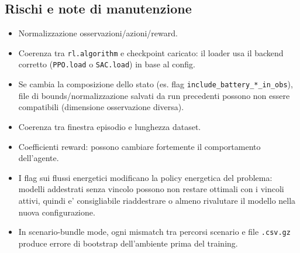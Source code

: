 \subsection*{Rischi e note di manutenzione}
\begin{itemize}[leftmargin=1.2cm]
\item Normalizzazione osservazioni/azioni/reward.
\item Coerenza tra \texttt{rl.algorithm} e checkpoint caricato:
  il loader usa il backend corretto (\texttt{PPO.load} o \texttt{SAC.load}) in base al config.
\item Se cambia la composizione dello stato (es. flag \texttt{include\_battery\_*\_in\_obs}),
  file di bounds/normalizzazione salvati da run precedenti possono non essere compatibili
  (dimensione osservazione diversa).
\item Coerenza tra finestra episodio e lunghezza dataset.
\item Coefficienti reward: possono cambiare fortemente il comportamento dell'agente.
\item I flag sui flussi energetici modificano la policy energetica del problema:
  modelli addestrati senza vincolo possono non restare ottimali con i vincoli attivi, quindi
  e' consigliabile riaddestrare o almeno rivalutare il modello nella nuova configurazione.
\item In scenario-bundle mode, ogni mismatch tra percorsi scenario e file \texttt{.csv.gz}
  produce errore di bootstrap dell'ambiente prima del training.
\end{itemize}
